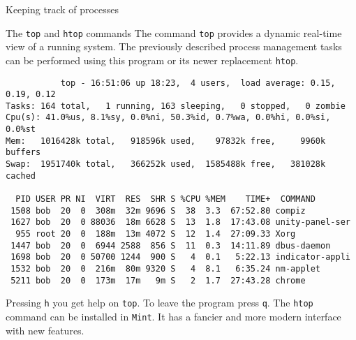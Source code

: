 \begin{frame}[t,fragile]{Keeping track of processes}
  \begin{block}{The \alert{\texttt{top}} and \alert{\texttt{htop}} commands}
    {\footnotesize
 The command \alert{\texttt{top}}   provides  a dynamic real-time view of a running
       system. The previously described process management tasks can be performed
       using this program or its newer replacement \alert{\texttt{htop}}.}

{\tiny
         \begin{lstlisting}
           top - 16:51:06 up 18:23,  4 users,  load average: 0.15, 0.19, 0.12
Tasks: 164 total,   1 running, 163 sleeping,   0 stopped,   0 zombie
Cpu(s): 41.0%us, 8.1%sy, 0.0%ni, 50.3%id, 0.7%wa, 0.0%hi, 0.0%si, 0.0%st
Mem:   1016428k total,   918596k used,    97832k free,     9960k buffers
Swap:  1951740k total,   366252k used,  1585488k free,   381028k cached

  PID USER PR NI  VIRT  RES  SHR S %CPU %MEM    TIME+  COMMAND            
 1508 bob  20  0  308m  32m 9696 S  38  3.3  67:52.80 compiz             
 1627 bob  20  0 88036  18m 6628 S  13  1.8  17:43.08 unity-panel-ser    
  955 root 20  0  188m  13m 4072 S  12  1.4  27:09.33 Xorg               
 1447 bob  20  0  6944 2588  856 S  11  0.3  14:11.89 dbus-daemon        
 1698 bob  20  0 50700 1244  900 S   4  0.1   5:22.13 indicator-appli    
 1532 bob  20  0  216m  80m 9320 S   4  8.1   6:35.24 nm-applet          
 5211 bob  20  0  173m  17m   9m S   2  1.7  27:43.28 chrome             
      \end{lstlisting}
    } {\footnotesize Pressing \alert{\texttt{h}} you get help on
      \texttt{top}. To leave the program press \alert{\texttt{q}}. The
      \texttt{htop} command can be installed in \texttt{Mint}. It has
      a fancier and more modern interface with new features.

  }
  \end{block}
  
\end{frame}
